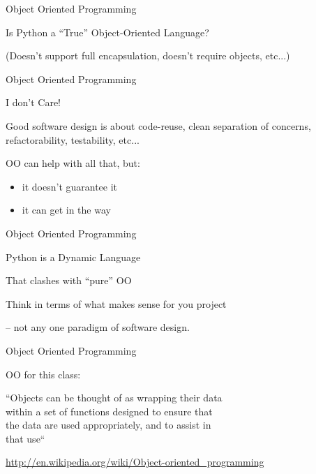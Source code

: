 \documentclass{beamer}
\begin{document}
\begin{frame}[fragile]{Object Oriented Programming}

\vfill
 {\LARGE Is Python a ``True'' Object-Oriented Language?}

\vfill
{\Large (Doesn't support full encapsulation, doesn't require objects, etc...)}

\end{frame} 

\begin{frame}[fragile]{Object Oriented Programming}

\vfill
 {\LARGE I don't Care!}

\vfill
{\Large Good software design is about code-reuse, clean separation of concerns,
refactorability, testability, etc...}

\vfill
{\Large OO can help with all that, but:
\begin{itemize}
  \item it doesn't guarantee it
  \item it can get in the way
\end{itemize}
}

\end{frame} 

\begin{frame}[fragile]{Object Oriented Programming}

\vfill
 {\LARGE Python is a Dynamic Language}

\vfill
{\Large That clashes with ``pure'' OO}

\vfill
{\Large Think in terms of what makes sense for you project

 -- not any one paradigm of software design.
}


\end{frame} 

\begin{frame}[fragile]{Object Oriented Programming}

\vfill
 {\LARGE OO for this class:}

\vfill
{\Large 
``Objects can be thought of as wrapping their data \\[.03in]
within a set of functions designed to ensure that \\[.03in]
the data are used appropriately, and to assist in \\[.03in]
that use``
}

\vfill
{\small
\url{http://en.wikipedia.org/wiki/Object-oriented_programming}
}

\end{frame} 
\end{document}
